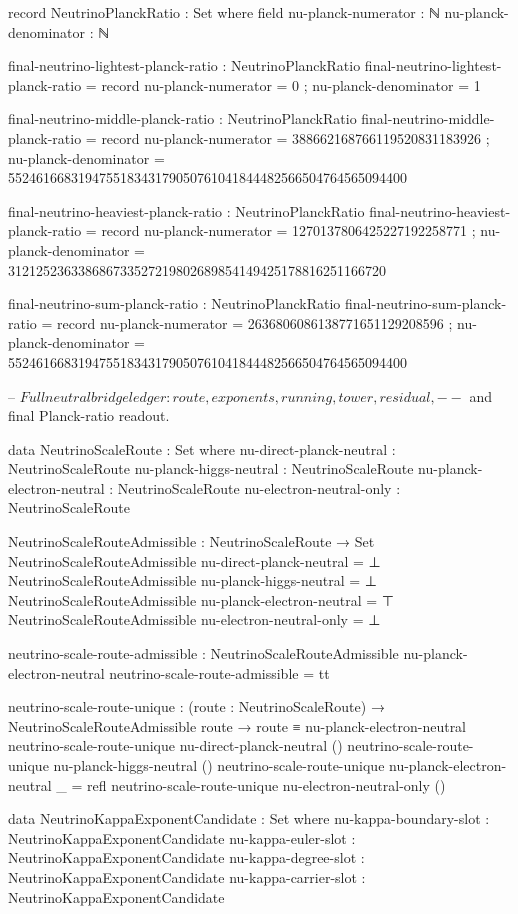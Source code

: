 \documentclass[11pt,a4paper]{book}
\begin{document}
\begin{code}
record NeutrinoPlanckRatio : Set where
  field
    nu-planck-numerator   : ℕ
    nu-planck-denominator : ℕ

final-neutrino-lightest-planck-ratio : NeutrinoPlanckRatio
final-neutrino-lightest-planck-ratio = record
  { nu-planck-numerator   = 0
  ; nu-planck-denominator = 1 }

final-neutrino-middle-planck-ratio : NeutrinoPlanckRatio
final-neutrino-middle-planck-ratio = record
  { nu-planck-numerator   = 388662168766119520831183926
  ; nu-planck-denominator =
      552461668319475518343179050761041844482566504764565094400 }

final-neutrino-heaviest-planck-ratio : NeutrinoPlanckRatio
final-neutrino-heaviest-planck-ratio = record
  { nu-planck-numerator   = 1270137806425227192258771
  ; nu-planck-denominator =
      312125236338686733527219802689854149425178816251166720 }

final-neutrino-sum-planck-ratio : NeutrinoPlanckRatio
final-neutrino-sum-planck-ratio = record
  { nu-planck-numerator   = 2636806086138771651129208596
  ; nu-planck-denominator =
      552461668319475518343179050761041844482566504764565094400 }

-- $ Full neutral bridge ledger: route, exponents, running, tower, residual,
-- $ and final Planck-ratio readout.

data NeutrinoScaleRoute : Set where
  nu-direct-planck-neutral   : NeutrinoScaleRoute
  nu-planck-higgs-neutral    : NeutrinoScaleRoute
  nu-planck-electron-neutral : NeutrinoScaleRoute
  nu-electron-neutral-only   : NeutrinoScaleRoute

NeutrinoScaleRouteAdmissible : NeutrinoScaleRoute → Set
NeutrinoScaleRouteAdmissible nu-direct-planck-neutral   = ⊥
NeutrinoScaleRouteAdmissible nu-planck-higgs-neutral    = ⊥
NeutrinoScaleRouteAdmissible nu-planck-electron-neutral = ⊤
NeutrinoScaleRouteAdmissible nu-electron-neutral-only   = ⊥

neutrino-scale-route-admissible :
  NeutrinoScaleRouteAdmissible nu-planck-electron-neutral
neutrino-scale-route-admissible = tt

neutrino-scale-route-unique :
  (route : NeutrinoScaleRoute) →
  NeutrinoScaleRouteAdmissible route →
  route ≡ nu-planck-electron-neutral
neutrino-scale-route-unique nu-direct-planck-neutral ()
neutrino-scale-route-unique nu-planck-higgs-neutral ()
neutrino-scale-route-unique nu-planck-electron-neutral _ = refl
neutrino-scale-route-unique nu-electron-neutral-only ()

data NeutrinoKappaExponentCandidate : Set where
  nu-kappa-boundary-slot : NeutrinoKappaExponentCandidate
  nu-kappa-euler-slot    : NeutrinoKappaExponentCandidate
  nu-kappa-degree-slot   : NeutrinoKappaExponentCandidate
  nu-kappa-carrier-slot  : NeutrinoKappaExponentCandidate


\end{code}
\end{document}
